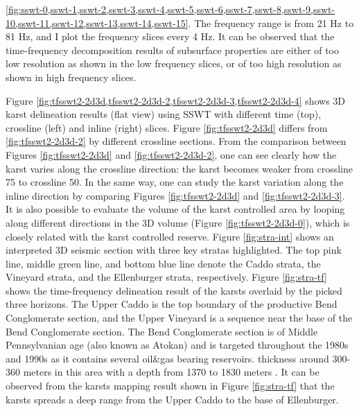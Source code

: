 \ref{fig:sswt-0,sswt-1,sswt-2,sswt-3,sswt-4,sswt-5,sswt-6,sswt-7,sswt-8,sswt-9,sswt-10,sswt-11,sswt-12,sswt-13,sswt-14,sswt-15}. The frequency range is from 21 Hz to 81 Hz, and I plot the frequency slices every 4 Hz. It can be observed that the time-frequency decomposition results of subsurface properties are either of too low resolution\new{,} as shown in the low frequency slices, or of too high resolution as shown in high frequency slices.  


Figure \ref{fig:tfsswt2-2d3d,tfsswt2-2d3d-2,tfsswt2-2d3d-3,tfsswt2-2d3d-4} shows 3D karst delineation results (flat view) using SSWT with different time (top), crossline (left) and inline (right) slices. Figure \ref{fig:tfsswt2-2d3d} differs from \ref{fig:tfsswt2-2d3d-2} by different crossline sections. From the comparison between Figures \ref{fig:tfsswt2-2d3d} and \ref{fig:tfsswt2-2d3d-2}, one can see clearly how the karst varies along the crossline direction: the karst becomes weaker from crossline 75 to crossline 50. In the same way, one can study the karst variation along the inline direction by comparing Figures \ref{fig:tfsswt2-2d3d} and \ref{fig:tfsswt2-2d3d-3}. %
It is also possible to evaluate the volume of the karst controlled area by looping along different directions in the 3D volume (Figure \ref{fig:tfsswt2-2d3d-0}), which is closely related with the karst controlled reserve.  Figure \ref{fig:stra-int} shows an interpreted 3D seismic section with three key stratas highlighted. The top pink line, middle green line, and bottom blue line denote the Caddo strata,  the Vineyard strata, and the Ellenburger strata, respectively. Figure \ref{fig:stra-tf} shows the time-frequency delineation result of the karsts overlaid by the picked three horizons. The Upper Caddo is the top boundary of the productive Bend Conglomerate section, and the Upper Vineyard is a sequence near the base of the Bend Conglomerate section. The Bend Conglomerate section is of Middle Pennsylvanian age (also known as Atokan) and is targeted throughout the 1980s and 1990s as it contains several oil\&gas bearing reservoirs.  thickness  around 300-360 meters in this area\new{,} with a depth from 1370 to 1830 meters \cite[]{hardage1996,hardage1996b}.   It can be observed from the karsts mapping result shown in Figure \ref{fig:stra-tf} that the karsts spreads a deep range from the Upper Caddo to the base of Ellenburger. %
